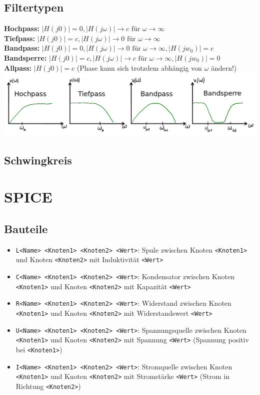 \documentclass[fs, footer]{latex4ei}
\begin{document}
\begin{multicols*}{4}
\subsection{Filtertypen}
\textbf{Hochpass:} $|H(j0)| = 0, |H(j\omega)| \rightarrow c \text{ für } \omega \rightarrow \infty$\\
\textbf{Tiefpass:} $|H(j0)| = c, |H(j\omega)| \rightarrow 0 \text{ für } \omega \rightarrow \infty$\\
\textbf{Bandpass:} $|H(j0)| = 0, |H(j\omega)| \rightarrow 0 \text{ für } \omega \rightarrow \infty, |H(jw_0)| = c$\\
\textbf{Bandsperre:} $|H(j0)| = c, |H(j\omega)| \rightarrow c \text{ für } \omega \rightarrow \infty, |H(jw_0)| = 0$\\
\textbf{Allpass:} $|H(j0)| = c$ (Phase kann sich trotzdem abhängig von $\omega$ ändern!)\\
\includegraphics[width=\linewidth]{img/filtertypen}
\subsection{Schwingkreis}
\section{SPICE}
\renewcommand{\t}{\texttt}
\subsection{Bauteile}
\begin{itemize}
	\item \t{L<Name> <Knoten1> <Knoten2> <Wert>}: Spule zwischen Knoten \t{<Knoten1>} und Knoten \t{<Knoten2>} mit Induktivität \t{<Wert>}
	\item \t{C<Name> <Knoten1> <Knoten2> <Wert>}: Kondensator zwischen Knoten \t{<Knoten1>} und Knoten \t{<Knoten2>} mit Kapazität \t{<Wert>}
	\item \t{R<Name> <Knoten1> <Knoten2> <Wert>}: Widerstand zwischen Knoten \t{<Knoten1>} und Knoten \t{<Knoten2>} mit Widerstandswert \t{<Wert>}
	\item \t{U<Name> <Knoten1> <Knoten2> <Wert>}: Spannungsquelle zwischen Knoten \t{<Knoten1>} und Knoten \t{<Knoten2>} mit Spannung \t{<Wert>} (Spannung positiv bei \t{<Knoten1>})
	\item \t{I<Name> <Knoten1> <Knoten2> <Wert>}: Stromquelle zwischen Knoten \t{<Knoten1>} und Knoten \t{<Knoten2>} mit Stromstärke \t{<Wert>} (Strom in Richtung \t{<Knoten2>})
\end{itemize}

\end{multicols*}
\end{document}
